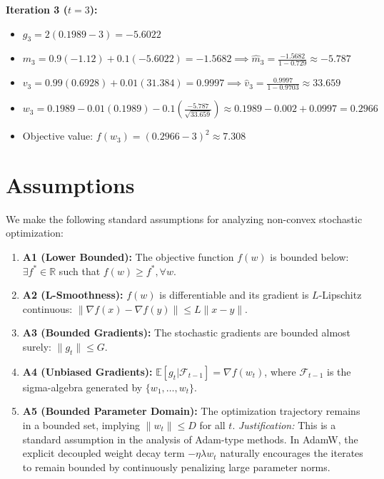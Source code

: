 \documentclass[11pt]{article}
\begin{document}
\textbf{Iteration 3 ($t=3$):}
\begin{itemize}
    \item $g_3 = 2(0.1989-3) = -5.6022$
    \item $m_3 = 0.9(-1.12) + 0.1(-5.6022) = -1.5682 \implies \hat{m}_3 = \frac{-1.5682}{1-0.729} \approx -5.787$
    \item $v_3 = 0.99(0.6928) + 0.01(31.384) = 0.9997 \implies \hat{v}_3 = \frac{0.9997}{1-0.9703} \approx 33.659$
    \item $w_3 = 0.1989 - 0.01(0.1989) - 0.1 \left(\frac{-5.787}{\sqrt{33.659}}\right) \approx 0.1989 - 0.002 + 0.0997 = 0.2966$
    \item Objective value: $f(w_3) = (0.2966-3)^2 \approx 7.308$
\end{itemize}

\section*{Assumptions}
We make the following standard assumptions for analyzing non-convex stochastic optimization:
\begin{enumerate}
    \item \textbf{A1 (Lower Bounded):} The objective function $f(w)$ is bounded below: $\exists f^* \in \mathbb{R}$ such that $f(w) \geq f^*, \forall w$.
    \item \textbf{A2 (L-Smoothness):} $f(w)$ is differentiable and its gradient is $L$-Lipschitz continuous: $\|\nabla f(x) - \nabla f(y)\| \leq L\|x-y\|$.
    \item \textbf{A3 (Bounded Gradients):} The stochastic gradients are bounded almost surely: $\|g_t\| \leq G$.
    \item \textbf{A4 (Unbiased Gradients):} $\mathbb{E}[g_t | \mathcal{F}_{t-1}] = \nabla f(w_t)$, where $\mathcal{F}_{t-1}$ is the sigma-algebra generated by $\{w_1, \dots, w_t\}$.
    \item \textbf{A5 (Bounded Parameter Domain):} The optimization trajectory remains in a bounded set, implying $\|w_t\| \leq D$ for all $t$. 
    \textit{Justification:} This is a standard assumption in the analysis of Adam-type methods. In AdamW, the explicit decoupled weight decay term $-\eta \lambda w_t$ naturally encourages the iterates to remain bounded by continuously penalizing large parameter norms.
\end{enumerate}
\end{document}
